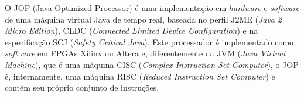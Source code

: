 \documentclass[10pt,twocolumn]{article}
\begin{document}
	O JOP (Java Optimized Processor) é uma implementação em \emph{hardware} e  \emph{software} de uma máquina virtual {J}ava de tempo real, baseada no perfil J2ME (\emph{Java 2 Micro Edition}), CLDC (\emph{Connected Limited Device Configuration}) e na especificação SCJ (\emph{Safety Critical Java}). Este processador é implementado como \emph {soft core} em FPGAs Xilinx ou Altera e, diferentemente da JVM (\emph{Java Virtual Machine}), que é uma máquina CISC (\emph{Complex Instruction Set Computer})\cite{PattersonHSI}, o JOP é, internamente, uma máquina  RISC (\emph{Reduced Instruction Set Computer}) \cite{PattersonHSI}  e contém seu próprio conjunto de ins\-tru\-ções.
\end{document}
